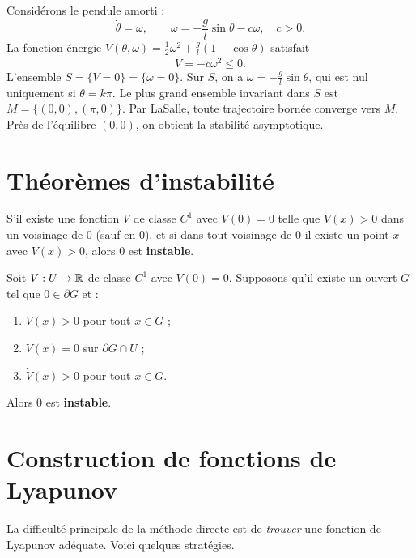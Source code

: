 \begin{exemple}
Consid\'erons le pendule amorti :
\[
    \dot{\theta} = \omega, \qquad \dot{\omega} = -\frac{g}{l}\sin\theta - c\omega,
    \quad c > 0.
\]
La fonction \'energie $V(\theta, \omega) = \frac{1}{2}\omega^2 + \frac{g}{l}(1 - \cos\theta)$
satisfait
\[
    \dot{V} = -c\omega^2 \leq 0.
\]
L'ensemble $S = \{\dot{V} = 0\} = \{\omega = 0\}$. Sur $S$, on a
$\dot{\omega} = -\frac{g}{l}\sin\theta$, qui est nul uniquement si
$\theta = k\pi$. Le plus grand ensemble invariant dans $S$ est
$M = \{(0, 0), (\pi, 0)\}$. Par LaSalle, toute trajectoire born\'ee converge
vers $M$. Pr\`es de l'\'equilibre $(0,0)$, on obtient la stabilit\'e asymptotique.
\end{exemple}

\section{Th\'eor\`emes d'instabilit\'e}

\begin{theoreme}
\label{thm:instabilite-lyap}
S'il existe une fonction $V$ de classe $C^1$ avec $V(0) = 0$ telle que
$\dot{V}(x) > 0$ dans un voisinage de $0$ (sauf en $0$), et si dans tout
voisinage de $0$ il existe un point $x$ avec $V(x) > 0$, alors $0$ est
\textbf{instable}.
\end{theoreme}

\begin{theoreme}
Soit $V : U \to \mathbb{R}$ de classe $C^1$ avec $V(0) = 0$. Supposons qu'il existe
un ouvert $G$ tel que $0 \in \partial G$ et :
\begin{enumerate}
    \item $V(x) > 0$ pour tout $x \in G$ ;
    \item $V(x) = 0$ sur $\partial G \cap U$ ;
    \item $\dot{V}(x) > 0$ pour tout $x \in G$.
\end{enumerate}
Alors $0$ est \textbf{instable}.
\end{theoreme}

\section{Construction de fonctions de Lyapunov}

La difficult\'e principale de la m\'ethode directe est de \emph{trouver} une
fonction de Lyapunov ad\'equate. Voici quelques strat\'egies.

